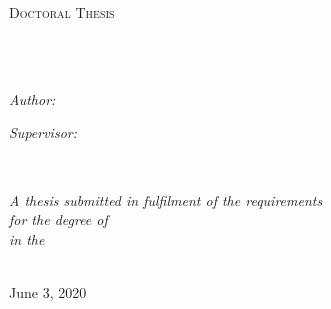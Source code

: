 \documentclass[
11pt, %
english, %
singlespacing, %
headsepline, %
]{MastersDoctoralThesis} %
\author{Miguel \textsc{Rivera}} %
\begin{document}
\pagestyle{plain} %


\begin{titlepage}
\begin{center}

\vspace*{.06\textheight}
{\scshape\LARGE \univname\par}\vspace{1.5cm} %
\textsc{\Large Doctoral Thesis}\\[0.5cm] %

\HRule \\[0.4cm] %
{\huge \bfseries \ttitle\par}\vspace{0.4cm} %
\HRule \\[1.5cm] %
 
\begin{minipage}[t]{0.4\textwidth}
\begin{flushleft} \large
\emph{Author:}\\
{\authorname} %
\end{flushleft}
\end{minipage}
\begin{minipage}[t]{0.4\textwidth}
\begin{flushright} \large
\emph{Supervisor:} \\
{\supname} %
\end{flushright}
\end{minipage}\\[3cm]
 
\vfill

\large \textit{A thesis submitted in fulfilment of the requirements\\ for the degree of \degreename}\\[0.3cm] %
\textit{in the}\\[0.4cm]
\deptname\\[2cm] %
 
\vfill

{\large June 3, 2020}\\[4cm] %
 
\vfill
\end{center}
\end{titlepage}
\end{document}
